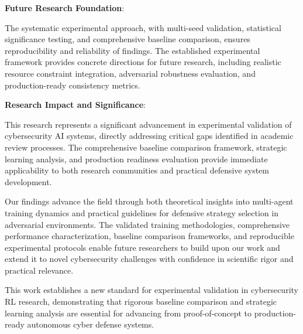 \documentclass[12pt,twoside]{article}
\begin{document}
\textbf{Future Research Foundation}:

The systematic experimental approach, with multi-seed validation, statistical significance testing, and comprehensive baseline comparison, ensures reproducibility and reliability of findings. The established experimental framework provides concrete directions for future research, including realistic resource constraint integration, adversarial robustness evaluation, and production-ready consistency metrics.

\textbf{Research Impact and Significance}:

This research represents a significant advancement in experimental validation of cybersecurity AI systems, directly addressing critical gaps identified in academic review processes. The comprehensive baseline comparison framework, strategic learning analysis, and production readiness evaluation provide immediate applicability to both research communities and practical defensive system development.

Our findings advance the field through both theoretical insights into multi-agent training dynamics and practical guidelines for defensive strategy selection in adversarial environments. The validated training methodologies, comprehensive performance characterization, baseline comparison frameworks, and reproducible experimental protocols enable future researchers to build upon our work and extend it to novel cybersecurity challenges with confidence in scientific rigor and practical relevance.

This work establishes a new standard for experimental validation in cybersecurity RL research, demonstrating that rigorous baseline comparison and strategic learning analysis are essential for advancing from proof-of-concept to production-ready autonomous cyber defense systems.



\end{document}
